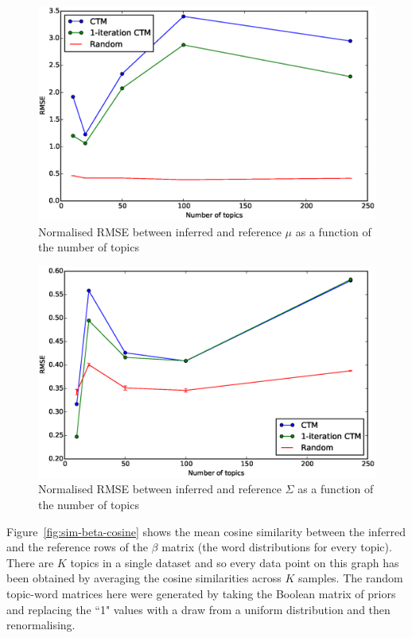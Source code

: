 \documentclass[12pt,a4paper,twoside,openright]{report}
\begin{document}
\begin{figure}[!htb]
\includegraphics[width=\textwidth]{sim-mu-rmse.eps}
\caption{Normalised RMSE between inferred and reference $\mu$ as a function of the number of topics}
\label{fig:sim-mu-rmse}
\end{figure}

\begin{figure}[!htb]
\includegraphics[width=\textwidth]{sim-sigma-rmse.eps}
\caption{Normalised RMSE between inferred and reference $\Sigma$ as a function of the number of topics}
\label{fig:sim-sigma-rmse}
\end{figure}

Figure~\ref{fig:sim-beta-cosine} shows the mean cosine similarity between the inferred and the reference rows of the $\beta$ matrix (the word distributions for every topic). There are $K$ topics in a single dataset and so every data point on this graph has been obtained by averaging the cosine similarities across $K$ samples. The random topic-word matrices here were generated by taking the Boolean matrix of priors and replacing the ``1" values with a draw from a uniform distribution and then renormalising.
\end{document}
